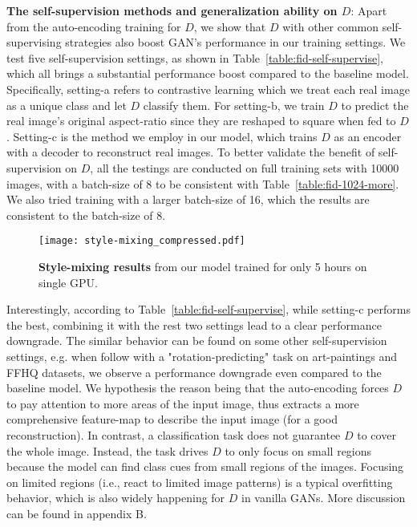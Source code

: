 \documentclass{article} \usepackage{iclr2021_conference,times}
\begin{document}
\textbf{The self-supervision methods and generalization ability  on $D$}: Apart from the auto-encoding training for $ D $, we show that $ D $ with other common self-supervising strategies also boost GAN's performance in our training settings. We test five self-supervision settings, as shown in Table~\ref{table:fid-self-supervise}, which all brings a substantial performance boost compared to the baseline model. Specifically, setting-a refers to contrastive learning which we treat each real image as a unique class and let $ D $ classify them. For setting-b, we train $D$ to predict the real image's original aspect-ratio since they are reshaped to square when fed to $D$. Setting-c is the method we employ in our model, which trains $ D $ as an encoder with a decoder to reconstruct real images. To better validate the benefit of self-supervision on $D$, all the testings are conducted on full training sets with 10000 images, with a batch-size of 8 to be consistent with Table~\ref{table:fid-1024-more}. We also tried training with a larger batch-size of 16, which the results are consistent to the batch-size of 8.

\begin{figure}
\centering
\texttt{[image: style-mixing\_compressed.pdf]}
\caption{\textbf{Style-mixing results} from our model trained for only 5 hours on single GPU. }
\label{fig:style-mixing}
\end{figure}

Interestingly, according to Table~\ref{table:fid-self-supervise}, while setting-c performs the best, combining it with the rest two settings lead to a clear performance downgrade. The similar behavior can be found on some other self-supervision settings, e.g. when follow \cite{chen2019self} with a "rotation-predicting" task on art-paintings and FFHQ datasets, we observe a performance downgrade even compared to the baseline model. We hypothesis the reason being that the auto-encoding forces $D$ to pay attention to more areas of the input image, thus extracts a more comprehensive feature-map to describe the input image (for a good reconstruction). In contrast, a classification task does not guarantee $D$ to cover the whole image. Instead, the task drives $D$ to only focus on small regions because the model can find class cues from small regions of the images. Focusing on limited regions (i.e., react to limited image patterns) is a typical overfitting behavior, which is also widely happening for $D$ in vanilla GANs. More discussion can be found in appendix B.
\end{document}
